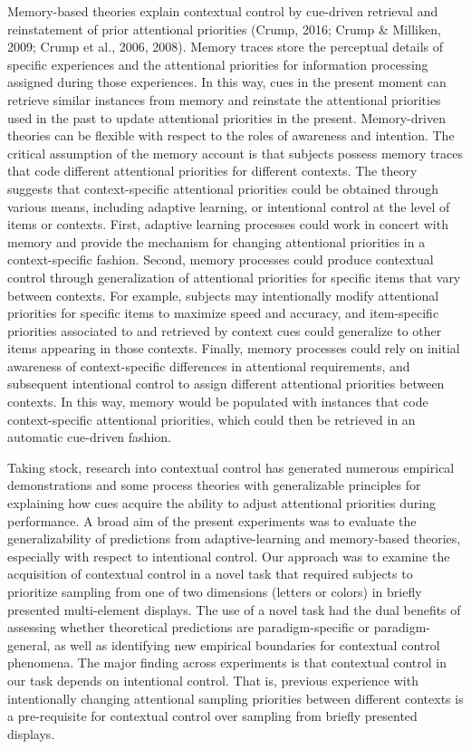 \documentclass[english,,man,floatsintext]{apa6}
\begin{document}
Memory-based theories explain contextual control by cue-driven retrieval
and reinstatement of prior attentional priorities (Crump, 2016; Crump \&
Milliken, 2009; Crump et al., 2006, 2008). Memory traces store the
perceptual details of specific experiences and the attentional
priorities for information processing assigned during those experiences.
In this way, cues in the present moment can retrieve similar instances
from memory and reinstate the attentional priorities used in the past to
update attentional priorities in the present. Memory-driven theories can
be flexible with respect to the roles of awareness and intention. The
critical assumption of the memory account is that subjects possess
memory traces that code different attentional priorities for different
contexts. The theory suggests that context-specific attentional
priorities could be obtained through various means, including adaptive
learning, or intentional control at the level of items or contexts.
First, adaptive learning processes could work in concert with memory and
provide the mechanism for changing attentional priorities in a
context-specific fashion. Second, memory processes could produce
contextual control through generalization of attentional priorities for
specific items that vary between contexts. For example, subjects may
intentionally modify attentional priorities for specific items to
maximize speed and accuracy, and item-specific priorities associated to
and retrieved by context cues could generalize to other items appearing
in those contexts. Finally, memory processes could rely on initial
awareness of context-specific differences in attentional requirements,
and subsequent intentional control to assign different attentional
priorities between contexts. In this way, memory would be populated with
instances that code context-specific attentional priorities, which could
then be retrieved in an automatic cue-driven fashion.

Taking stock, research into contextual control has generated numerous
empirical demonstrations and some process theories with generalizable
principles for explaining how cues acquire the ability to adjust
attentional priorities during performance. A broad aim of the present
experiments was to evaluate the generalizability of predictions from
adaptive-learning and memory-based theories, especially with respect to
intentional control. Our approach was to examine the acquisition of
contextual control in a novel task that required subjects to prioritize
sampling from one of two dimensions (letters or colors) in briefly
presented multi-element displays. The use of a novel task had the dual
benefits of assessing whether theoretical predictions are
paradigm-specific or paradigm-general, as well as identifying new
empirical boundaries for contextual control phenomena. The major finding
across experiments is that contextual control in our task depends on
intentional control. That is, previous experience with intentionally
changing attentional sampling priorities between different contexts is a
pre-requisite for contextual control over sampling from briefly
presented displays.
\end{document}

